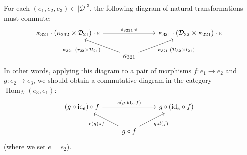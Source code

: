 \documentclass[fleqn]{article}
\newcommand{\oldpage}[1]{\marginpar{\footnotesize$\Big\vert$ \textit{p.~#1}}}
\newcommand{\id}{\mathrm{id}}
\newcommand{\cat}[1]{\mathcal{#1}}
\newcommand{\set}[1]{|#1|}
\DeclareMathOperator{\Hom}{Hom}
\begin{document}
\begin{enumerate}
    For each $(e_1,e_2,e_3)\in\set{\cat{D}}^3$, the following diagram of natural transformations must commute:
    \oldpage{245}
    \[
      \begin{tikzcd}
        \kappa_{321}\cdot(\kappa_{332}\times\cat{D}_{21})\cdot\varepsilon
          \ar[rr,"s_{3221}\cdot\varepsilon"]
      &&\kappa_{321}\cdot(\cat{D}_{32}\times\kappa_{221})\cdot\varepsilon
      \\&\kappa_{321}
          \ar[ul,"\kappa_{321}\cdot(r_{32}\times\cat{D}_{21})"]
          \ar[ur,swap,"\kappa_{321}\cdot(\cat{D}_{32}\times l_{21})"]
      \end{tikzcd}
    \]
    In other words, applying this diagram to a pair of morphisms $f\colon e_1\to e_2$ and $g\colon e_2\to e_3$, we should obtain a commutative diagram in the category $\Hom_\cat{D}(e_3,e_1)$:
    \[
      \begin{tikzcd}
        (g\circ\id_e)\circ f
          \ar[rr,"{s(g,\id_e,f)}"]
      &&g\circ(\id_e\circ f)
      \\
      & g\circ f
          \ar[ul,"{r(g)\circ f}"]
          \ar[ur,swap,"{g\circ l(f)}"]
      \end{tikzcd}
    \]
    (where we set $e=e_2$).


\end{enumerate}
\end{document}
